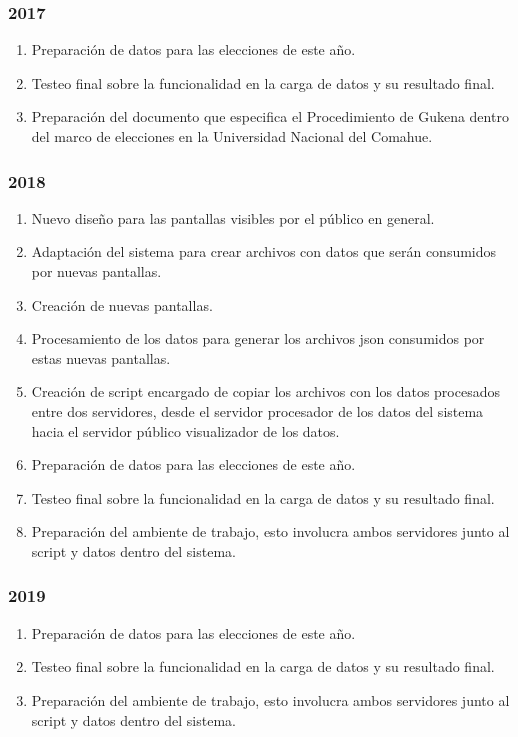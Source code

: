 \subsubsection{2017}
\begin{enumerate}
    \item Preparación de datos para las elecciones de este año.
    \item Testeo final sobre la funcionalidad en la carga de datos y su resultado final.
    \item Preparación del documento que especifica el Procedimiento de Gukena dentro del marco de elecciones en la Universidad Nacional del Comahue.
\end{enumerate}
\subsubsection{2018}
\begin{enumerate}
    \item Nuevo diseño para las pantallas visibles por el público en general.
    \item Adaptación del sistema para crear archivos con datos que serán consumidos por nuevas pantallas.
    \item Creación de nuevas pantallas.
    \item Procesamiento de los datos para generar los archivos json consumidos por estas nuevas pantallas.
    \item Creación de script encargado de copiar los archivos con los datos procesados entre dos servidores, desde el servidor procesador de los datos del sistema hacia el servidor público visualizador de los datos.
    \item Preparación de datos para las elecciones de este año.
    \item Testeo final sobre la funcionalidad en la carga de datos y su resultado final.
    \item Preparación del ambiente de trabajo, esto involucra ambos servidores junto al script y datos dentro del sistema.
\end{enumerate}
\subsubsection{2019}
\begin{enumerate}
    \item Preparación de datos para las elecciones de este año.
    \item Testeo final sobre la funcionalidad en la carga de datos y su resultado final.
    \item Preparación del ambiente de trabajo, esto involucra ambos servidores junto al script y datos dentro del sistema.
\end{enumerate}

